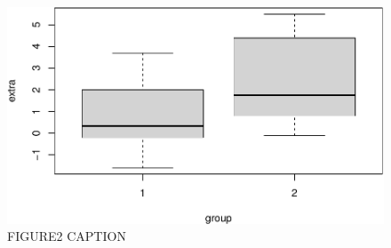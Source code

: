 \documentclass[fleqn,10pt]{wlscirep}
\begin{document}
\begin{figure}
\centering
\includegraphics[width=\linewidth, angle=0, scale=1.0, keepaspectratio=true]{figures/T-test-1.pdf}
\caption{FIGURE2 CAPTION}
\label{fig:FIGURE2_LABEL}
\end{figure}

%    
\end{document}
